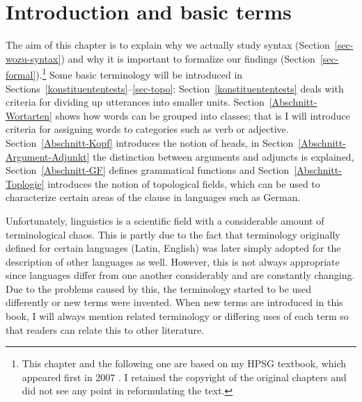 
\chapter{Introduction and basic terms}
\label{Kapitel-Grundbegriffe}\label{chap-boxes}

The aim of this chapter is to explain why we actually study syntax
(Section~\ref{sec-wozu-syntax}) and why it is important to formalize our findings
(Section~\ref{sec-formal}).\footnote{
  This chapter and the following one are based on my HPSG textbook, which appeared first in 2007
  \citep{MuellerLehrbuch1}. I retained the copyright of the original chapters and did not see any
  point in reformulating the text.%
} Some basic terminology will be introduced in
Sections~\ref{konstituententests}--\ref{sec-topo}: Section~\ref{konstituententests}
deals with criteria for dividing up utterances into smaller units. Section~\ref{Abschnitt-Wortarten} 
shows how words can be grouped into classes; that is I will introduce criteria for assigning words to
categories such as verb or adjective. Section~\ref{Abschnitt-Kopf} introduces the notion of 
heads, in
Section~\ref{Abschnitt-Argument-Adjunkt} the distinction between arguments and adjuncts is explained,
Section~\ref{Abschnitt-GF} defines grammatical functions and
Section~\ref{Abschnitt-Toplogie} introduces the notion of topological fields, which can be used to
characterize certain areas of the clause in languages such as German. 

Unfortunately, linguistics is a scientific field 
with a considerable amount of terminological chaos.
This is partly due to the fact that terminology originally defined for certain languages 
(\eg Latin, English)
was later simply adopted for the description of other languages as well. However, this is not always
appropriate since languages differ from one another considerably and are constantly changing.  
Due to the problems caused by this, the terminology started to be used differently or new terms were invented. 
When new terms are introduced in this book, I will always mention related terminology or differing uses of
each term so that readers can relate this to other literature.  


